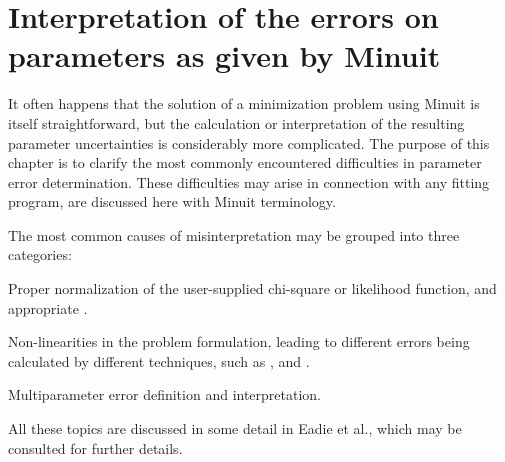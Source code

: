  
\chapter{Interpretation of the errors on parameters
as given by Minuit}
 
It often happens that the solution of a minimization problem using 
Minuit is itself straightforward, but the calculation or 
interpretation of the resulting parameter uncertainties is 
considerably more complicated. The purpose of this chapter is to 
clarify the most commonly encountered difficulties in parameter 
error determination. These difficulties may arise in connection with 
any fitting program, are discussed here with Minuit 
terminology.
 
The most common causes of misinterpretation may be grouped into 
three categories:
 
\begin{OL}
\item Proper normalization of the user-supplied chi-square or likelihood 
      function, and appropriate .
\item Non-linearities in the problem formulation, leading to different 
      errors being calculated by different techniques, such as , 
       and .
\item Multiparameter error definition and interpretation.
\end{OL}
 
All these topics are discussed in some detail in Eadie et al.\cite{bib-EADIE},
which may be consulted for further details.
 
